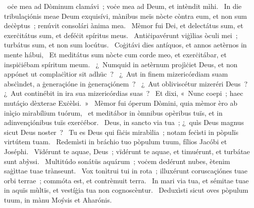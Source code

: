 \psalmChapterWithInscription{}
{ }
{%
~oċe mea ad Dòminum clamávi~; voċe mea ad Deum, et intèndit mìhi. 
~In die tribulaçiónis meae Deum exquisívi, mànibus meïs nòcte còntra eum, et non sum deċèptus~; renúvit consolári ànima mea. 
~Mèmor fui Dei, et delectátus sum, et exerċitátus sum, et deféċit spíritus meus. 
~Antiċipavérunt viġìlias òculi mei~; turbátus sum, et non sum locútus. 
~Coġitávi dies antíquos, et annos aetèrnos in mente hábui, 
~Et meditátus sum nòcte cum corde meo, et exerċitábar, et inspiċiébam spíritum meum. 
~¿~Numquid in aetèrnum projìċiet Deus, et non appónet ut complaċìtior sit adhüc~? 
~¿~Aut in finem mizericórdiam suam absċìndet, a ġeneraçióne in ġeneraçiónem~? 
~¿~Aut obliviscétur mizeréri Deus~? ¿~Aut continébit in ira sua mizericórdias suas~? 
~Et dixi, «~Nunc coepi~; haec mutáçio dèxterae Exċèlsi.~»
~Mèmor fui óperum Dòmini, quia mèmor èro ab inìçio mirabílium tuórum, 
~et meditábor in òmnibus opèribus tuïs, et in adinvençiónibus tuïs exerċébor. 
~Deus, in sancto via tua~; ¿~quìs Deus magnus sicut Deus noster~? 
~Tu es Deus qui fàċis mirabìlia~; notam feċìsti in pòpulïs virtútem tuam. 
~Redemìsti in bráchio tuo pòpulum tuum, fílios Jacóbi et Joséphi. 
~Vïdérunt te aquae, Deus~; vïdérunt te aquae, et timuérunt, et turbátae sunt abỳssi. 
~Multitúdo sonátüs aquárum~; voċem dedérunt nubes, ètenim saġìttae tuae trànseunt. 
~Vox tonìtrui tui in rota~; illuxérunt coruscaçiónes tuae orbi terrae~; commóta est, et contrèmuit terra. 
~In mari via tua, et sémitae tuae in aquïs mùltïs, et vestíġia tua non cognoscèntur. 
~Deduxìsti sicut oves pòpulum tuum, in mànu Moýsis et Aharónis. 
}
